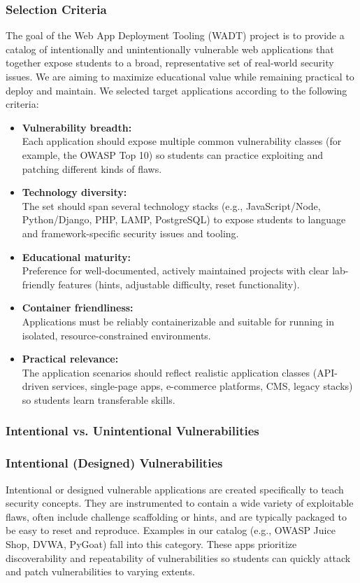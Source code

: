 \documentclass[12pt]{article}
\begin{document}
\subsubsection{Selection Criteria}
The goal of the Web App Deployment Tooling (WADT) project is to provide a catalog of intentionally and unintentionally vulnerable web applications that together expose students to a broad, representative set of real-world security issues. We are aiming to maximize educational value while remaining practical to deploy and maintain. We selected target applications according to the following criteria:

\begin{itemize}
    \item \textbf{Vulnerability breadth:}\\ Each application should expose multiple common vulnerability classes (for example, the OWASP Top 10) so students can practice exploiting and patching different kinds of flaws.
    \item \textbf{Technology diversity:}\\ The set should span several technology stacks (e.g., JavaScript/Node, Python/Django, PHP, LAMP, PostgreSQL) to expose students to language and framework-specific security issues and tooling.
    \item \textbf{Educational maturity:}\\ Preference for well-documented, actively maintained projects with clear lab-friendly features (hints, adjustable difficulty, reset functionality).
    \item \textbf{Container friendliness:}\\ Applications must be reliably containerizable and suitable for running in isolated, resource-constrained environments.
    \item \textbf{Practical relevance:}\\ The application scenarios should reflect realistic application classes (API-driven services, single-page apps, e-commerce platforms, CMS, legacy stacks) so students learn transferable skills.
\end{itemize}

\subsubsection{Intentional vs. Unintentional Vulnerabilities}

\subsubsection*{Intentional (Designed) Vulnerabilities}
Intentional or designed vulnerable applications are created specifically to teach security concepts. They are instrumented to contain a wide variety of exploitable flaws, often include challenge scaffolding or hints, and are typically packaged to be easy to reset and reproduce. Examples in our catalog (e.g., OWASP Juice Shop, DVWA, PyGoat) fall into this category. These apps prioritize discoverability and repeatability of vulnerabilities so students can quickly attack and patch vulnerabilities to varying extents.
\end{document}

